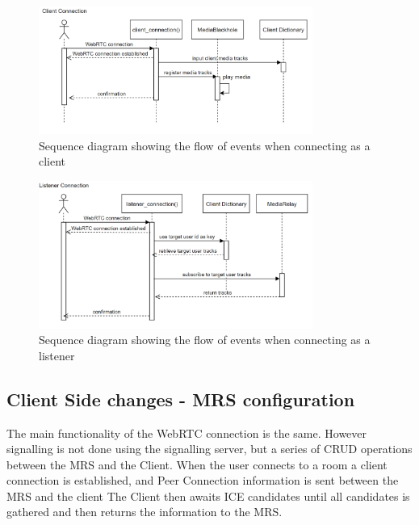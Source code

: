 \begin{figure}[ht]
    \centering
    \includegraphics[width=0.8\textwidth]{Pictures/Client connection.png}
    \caption{Sequence diagram showing the flow of events when connecting as a client}
    \label{fig:gantt}
\end{figure}

\begin{figure}[ht]
    \centering
    \includegraphics[width=0.8\textwidth]{Pictures/listener connection.png}
    \caption{Sequence diagram showing the flow of events when connecting as a listener}
    \label{fig:gantt}
\end{figure}

\newpage
\subsection{Client Side changes - MRS configuration}

The main functionality of the WebRTC connection is the same. However signalling is not done using the signalling server, but a series of CRUD operations between the MRS and the Client. When the user connects to a room a client connection is established, and Peer Connection information is sent between the MRS and the client The Client then awaits ICE candidates until all candidates is gathered and then returns the information to the MRS. 

